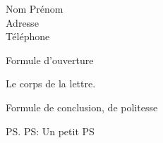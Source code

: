 \documentclass[letterpaper]{letter}
\begin{document}
    \begin{letter}{Nom Prénom \\ Adresse \\ Téléphone}
        \opening{Formule d'ouverture}
 
        Le corps de la lettre.
 
        \closing{Formule de conclusion, de politesse}
        \ps{PS: Un petit PS}
    \end{letter}
\end{document}
